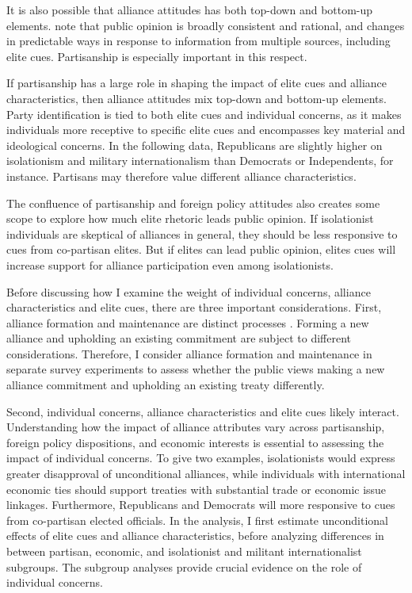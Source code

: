 \documentclass[12pt]{article}
\begin{document}
It is also possible that alliance attitudes has both top-down and bottom-up elements. 
\citet{PageShapiro1992} note that public opinion is broadly consistent and rational, and changes in predictable ways in response to information from multiple sources, including elite cues. 
Partisanship is especially important in this respect. 


If partisanship has a large role in shaping the impact of elite cues and alliance characteristics, then alliance attitudes mix top-down and bottom-up elements. 
Party identification is tied to both elite cues and individual concerns, as it makes individuals more receptive to specific elite cues and encompasses key material and ideological concerns. 
In the following data, Republicans are slightly higher on isolationism and military internationalism than Democrats or Independents, for instance. 
Partisans may therefore value different alliance characteristics. 


The confluence of partisanship and foreign policy attitudes also creates some scope to explore how much elite rhetoric leads public opinion. 
If isolationist individuals are skeptical of alliances in general, they should be less responsive to cues from co-partisan elites.
But if elites can lead public opinion, elites cues will increase support for alliance participation even among isolationists. 


Before discussing how I examine the weight of individual concerns, alliance characteristics and elite cues, there are three important considerations. 
First, alliance formation and maintenance are distinct processes \citep{Snyder1997}. 
Forming a new alliance and upholding an existing commitment are subject to different considerations.
Therefore, I consider alliance formation and maintenance in separate survey experiments to assess whether the public views making a new alliance commitment and upholding an existing treaty differently. 


Second, individual concerns, alliance characteristics and elite cues likely interact. 
Understanding how the impact of alliance attributes vary across partisanship, foreign policy dispositions, and economic interests is essential to assessing the impact of individual concerns. 
To give two examples, isolationists would express greater disapproval of unconditional alliances, while individuals with international economic ties should support treaties with substantial trade or economic issue linkages. 
Furthermore, Republicans and Democrats will more responsive to cues from co-partisan elected officials. 
In the analysis, I first estimate unconditional effects of elite cues and alliance characteristics, before analyzing differences in between partisan, economic, and isolationist and militant internationalist subgroups. 
The subgroup analyses provide crucial evidence on the role of individual concerns. 
\end{document}
